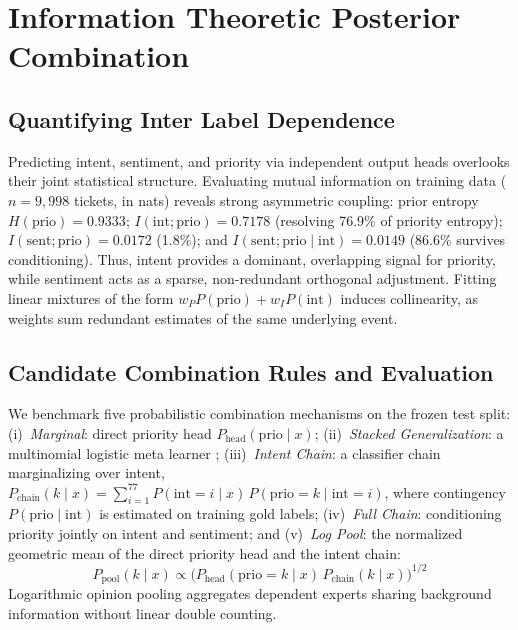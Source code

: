 \section{Information Theoretic Posterior Combination}
\label{sec:combination}

\subsection{Quantifying Inter Label Dependence}

Predicting intent, sentiment, and priority via independent output heads overlooks their joint statistical structure. Evaluating mutual information on training data ($n = 9{,}998$ tickets, in nats) reveals strong asymmetric coupling: prior entropy $H(\mathrm{prio}) = 0.9333$; $I(\mathrm{int}; \mathrm{prio}) = 0.7178$ (resolving 76.9\% of priority entropy); $I(\mathrm{sent}; \mathrm{prio}) = 0.0172$ (1.8\%); and $I(\mathrm{sent}; \mathrm{prio}\mid \mathrm{int}) = 0.0149$ (86.6\% survives conditioning). Thus, intent provides a dominant, overlapping signal for priority, while sentiment acts as a sparse, non-redundant orthogonal adjustment. Fitting linear mixtures of the form $w_P P(\mathrm{prio}) + w_I P(\mathrm{int})$ induces collinearity, as weights sum redundant estimates of the same underlying event.

\subsection{Candidate Combination Rules and Evaluation}

We benchmark five probabilistic combination mechanisms on the frozen test split: (i)~\emph{Marginal}: direct priority head $P_{\mathrm{head}}(\mathrm{prio}\mid x)$; (ii)~\emph{Stacked Generalization}: a multinomial logistic meta learner \cite{wolpert1992stacked}; (iii)~\emph{Intent Chain}: a classifier chain \cite{dembczynski2010pcc} marginalizing over intent, $P_{\mathrm{chain}}(k\mid x) = \sum_{i=1}^{77} P(\mathrm{int}{=}i\mid x)\, P(\mathrm{prio}{=}k\mid \mathrm{int}{=}i)$, where contingency $P(\mathrm{prio}\mid \mathrm{int})$ is estimated on training gold labels; (iv)~\emph{Full Chain}: conditioning priority jointly on intent and sentiment; and (v)~\emph{Log Pool}: the normalized geometric mean of the direct priority head and the intent chain:
\begin{equation}
P_{\mathrm{pool}}(k\mid x) \propto \bigl(P_{\mathrm{head}}(\mathrm{prio}{=}k\mid x)\, P_{\mathrm{chain}}(k\mid x)\bigr)^{1/2}
\label{eq:logpool}
\end{equation}
Logarithmic opinion pooling aggregates dependent experts sharing background information without linear double counting.

